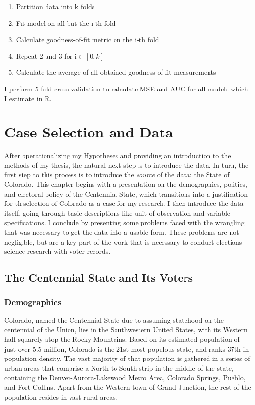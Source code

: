 \documentclass[12pt,twoside]{reedthesis}
\begin{document}
  \begin{enumerate}
  \item Partition data into k folds
  \item Fit model on all but the i-th fold
  \item Calculate goodness-of-fit metric on the i-th fold
  \item Repeat 2 and 3 for i$\in [0,k]$
  \item Calculate the average of all obtained goodness-of-fit measurements
  \end{enumerate}
  
  I perform 5-fold cross validation to calculate MSE and AUC for all
  models which I estimate in R.
  
  \chapter{Case Selection and Data}\label{case-selection-and-data}
  
  After operationalizing my Hypotheses and providing an introduction to
  the methods of my thesis, the natural next step is to introduce the
  data. In turn, the first step to this process is to introduce the
  \emph{source} of the data: the State of Colorado. This chapter begins
  with a presentation on the demographics, politics, and electoral policy
  of the Centennial State, which transitions into a justification for th
  selection of Colorado as a case for my research. I then introduce the
  data itself, going through basic descriptions like unit of observation
  and variable specifications. I conclude by presenting some problems
  faced with the wrangling that was necessary to get the data into a
  usable form. These problems are not negligible, but are a key part of
  the work that is necessary to conduct elections science research with
  voter records.
  
  \section{The Centennial State and Its
  Voters}\label{the-centennial-state-and-its-voters}
  
  \subsection{Demographics}\label{demographics}
  
  Colorado, named the Centennial State due to assuming statehood on the
  centennial of the Union, lies in the Southwestern United States, with
  its Western half squarely atop the Rocky Mountains. Based on its
  estimated population of just over 5.5 million, Colorado is the 21st most
  populous state, and ranks 37th in population density. The vast majority
  of that population is gathered in a series of urban areas that comprise
  a North-to-South strip in the middle of the state, containing the
  Denver-Aurora-Lakewood Metro Area, Colorado Springs, Pueblo, and Fort
  Collins. Apart from the Western town of Grand Junction, the rest of the
  population resides in vast rural areas.
  
\end{document}
